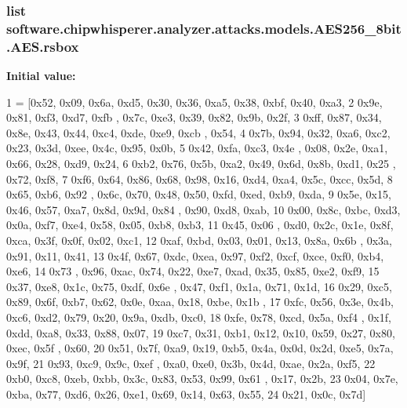 \subsubsection[{rsbox}]{\setlength{\rightskip}{0pt plus 5cm}list software.\+chipwhisperer.\+analyzer.\+attacks.\+models.\+A\+E\+S256\+\_\+8bit.\+A\+E\+S.\+rsbox\hspace{0.3cm}{\ttfamily [static]}}\label{classsoftware_1_1chipwhisperer_1_1analyzer_1_1attacks_1_1models_1_1AES256__8bit_1_1AES_af10fdd6936815d7191116ed75863d52c}
{\bfseries Initial value\+:}
\begin{DoxyCode}
1 = [0x52, 0x09, 0x6a, 0xd5, 0x30, 0x36, 0xa5, 0x38, 0xbf, 0x40, 0xa3,
2             0x9e, 0x81, 0xf3, 0xd7, 0xfb , 0x7c, 0xe3, 0x39, 0x82, 0x9b, 0x2f,
3             0xff, 0x87, 0x34, 0x8e, 0x43, 0x44, 0xc4, 0xde, 0xe9, 0xcb , 0x54,
4             0x7b, 0x94, 0x32, 0xa6, 0xc2, 0x23, 0x3d, 0xee, 0x4c, 0x95, 0x0b,
5             0x42, 0xfa, 0xc3, 0x4e , 0x08, 0x2e, 0xa1, 0x66, 0x28, 0xd9, 0x24,
6             0xb2, 0x76, 0x5b, 0xa2, 0x49, 0x6d, 0x8b, 0xd1, 0x25 , 0x72, 0xf8,
7             0xf6, 0x64, 0x86, 0x68, 0x98, 0x16, 0xd4, 0xa4, 0x5c, 0xcc, 0x5d,
8             0x65, 0xb6, 0x92 , 0x6c, 0x70, 0x48, 0x50, 0xfd, 0xed, 0xb9, 0xda,
9             0x5e, 0x15, 0x46, 0x57, 0xa7, 0x8d, 0x9d, 0x84 , 0x90, 0xd8, 0xab,
10             0x00, 0x8c, 0xbc, 0xd3, 0x0a, 0xf7, 0xe4, 0x58, 0x05, 0xb8, 0xb3,
11             0x45, 0x06 , 0xd0, 0x2c, 0x1e, 0x8f, 0xca, 0x3f, 0x0f, 0x02, 0xc1,
12             0xaf, 0xbd, 0x03, 0x01, 0x13, 0x8a, 0x6b , 0x3a, 0x91, 0x11, 0x41,
13             0x4f, 0x67, 0xdc, 0xea, 0x97, 0xf2, 0xcf, 0xce, 0xf0, 0xb4, 0xe6,
14             0x73 , 0x96, 0xac, 0x74, 0x22, 0xe7, 0xad, 0x35, 0x85, 0xe2, 0xf9,
15             0x37, 0xe8, 0x1c, 0x75, 0xdf, 0x6e , 0x47, 0xf1, 0x1a, 0x71, 0x1d,
16             0x29, 0xc5, 0x89, 0x6f, 0xb7, 0x62, 0x0e, 0xaa, 0x18, 0xbe, 0x1b ,
17             0xfc, 0x56, 0x3e, 0x4b, 0xc6, 0xd2, 0x79, 0x20, 0x9a, 0xdb, 0xc0,
18             0xfe, 0x78, 0xcd, 0x5a, 0xf4 , 0x1f, 0xdd, 0xa8, 0x33, 0x88, 0x07,
19             0xc7, 0x31, 0xb1, 0x12, 0x10, 0x59, 0x27, 0x80, 0xec, 0x5f , 0x60,
20             0x51, 0x7f, 0xa9, 0x19, 0xb5, 0x4a, 0x0d, 0x2d, 0xe5, 0x7a, 0x9f,
21             0x93, 0xc9, 0x9c, 0xef , 0xa0, 0xe0, 0x3b, 0x4d, 0xae, 0x2a, 0xf5,
22             0xb0, 0xc8, 0xeb, 0xbb, 0x3c, 0x83, 0x53, 0x99, 0x61 , 0x17, 0x2b,
23             0x04, 0x7e, 0xba, 0x77, 0xd6, 0x26, 0xe1, 0x69, 0x14, 0x63, 0x55,
24             0x21, 0x0c, 0x7d]
\end{DoxyCode}


